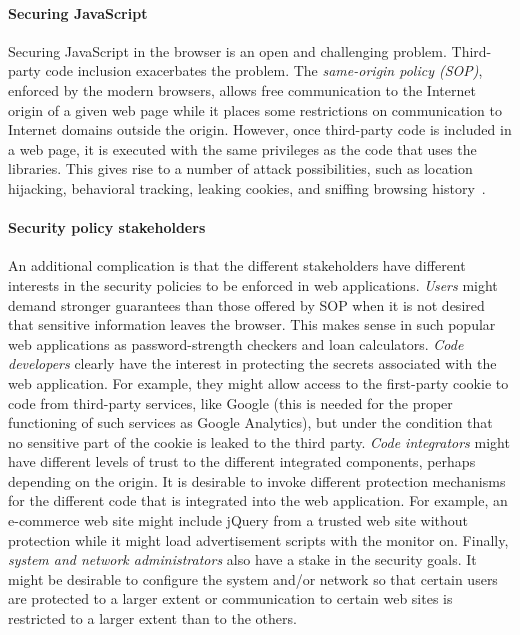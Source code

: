 \documentclass{llncs}
\begin{document}
\paragraph{Securing JavaScript}
Securing JavaScript in the browser is an open and challenging
problem. Third-party code inclusion exacerbates the
problem. The \emph{same-origin policy (SOP)}, enforced by the modern
browsers, allows free communication to the Internet origin of a given web page 
while it
places some restrictions on communication to Internet domains
outside the origin. However, once third-party code is
included in a web page, it is executed with the same privileges as the code
that uses the libraries. This gives rise to a number of attack possibilities,
such as location
hijacking, behavioral tracking, leaking cookies, and sniffing browsing history~\cite{Jang+:CCS10}. 

\paragraph{Security policy stakeholders}
An additional complication is that the different stakeholders have
different interests in the security policies to be enforced
in web applications. 
%
\emph{Users} might demand stronger guarantees than those
offered by SOP when it is not desired that sensitive information leaves
the browser. This makes sense in such popular web applications as
password-strength checkers and loan
calculators.
%
\emph{Code developers} clearly have the interest in protecting the
secrets associated with the web application. For example, they might
allow access to the first-party cookie to code from third-party
services, like Google (this is needed for the proper functioning of
such services
as Google Analytics), but under the condition that no sensitive part
of the cookie is leaked to the third party.
%
\emph{Code integrators} might have different levels of trust to the
different integrated components, perhaps depending on the origin. It
is desirable to invoke different protection mechanisms for the
different code that is integrated into the web application.
For example, an e-commerce web site might include jQuery from a trusted
web site without protection while it might load advertisement scripts
with the monitor on. 
%
Finally, \emph{system and network administrators} also have a
stake in the security goals. It might be desirable to configure the
system and/or network so that certain users are protected to a larger
extent or communication to certain web sites is restricted to a larger
extent than to the others.  
\end{document}
